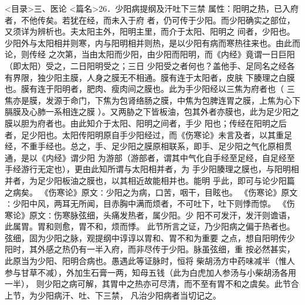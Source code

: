 \documentclass[a4paper,12pt,UTF8,twoside]{ctexbook}
\begin{document}
<目录>三、医论
<篇名>26．少阳病提纲及汗吐下三禁
属性：阳明之热，已入府者，不他传矣。若犹在经，而未入于府 
者，仍可传于少阳。而少阳确实之部位，又须详为辨析也。夫太阳主外，阳明主里，而介于太阳、阳明之 
间者，少阳也。少阳外与太阳相并则寒，内与阳明相并则热，是以少阳有病而寒热往来也。由此而论，则传经 
之次第，当由太阳而少阳，由少阳而阳明，而《内经》竟谓一日巨阳（即太阳）受之，二日阳明受之；三日 
少阳受之者何也？盖他手、足同名之经各有界限，独少阳主膜，人身之膜无不相通。膜有连于太阳者，皮肤 
下腠理之白膜也。膜有连于阳明者，肥肉、瘦肉间之膜也。此为手少阳经以三焦为府者也（ 
三焦亦是膜，发源于命门，下焦为包肾络肠之膜，中焦为包脾连胃之膜，上焦为心下膈膜及心肺一系相连之膜 
）。又两胁之下皆板油，包其外者亦膜也，此为足少阳之膜以胆为府者也。由此知介于太阳、阳明之间者，手少 
阳也；传经在阳明之后者，足少阳也。太阳传阳明原自手少阳经过，而《伤寒论》未言及者，以其重足 
经，不重手经也。总之，手、足少阳之膜原相联系，即手、足少阳之气化原相贯通，是以《内经》谓少阳 
为游部（游部者，谓其中气化自手经至足经，自足经至手经游行无定也），更由此知所谓与太阳相并者，为 
手少阳腠理之膜也，与阳明相并者，为足少阳板油之膜也，以其相近故能相并也。能明 
乎此，即可与论少阳篇之病矣。 
《伤寒论》原文∶少阳之为病，口苦，咽干，目眩也。 
《伤寒论》原文∶少阳中风，两耳无所闻，目赤胸中满而烦者，不可吐下，吐下则悸而惊。 
《伤寒论》原文∶伤寒脉弦细，头痛发热者，属少阳。少 
阳不可发汗，发汗则谵语，此属胃。胃和则愈，胃不和，烦而悸。 
此节所言之证，乃少阳病之偏于热者也。弦细，固为少阳之脉，观提纲中谆谆以胃和、胃不和为重要 
之点，想自阳明传少阳时，其外感之热仍有一半入府，而非尽传于少阳。脉虽弦细，重 
按必然甚实，此原当为少阳、阳明合病也。愚遇此等证脉时，恒将 
柴胡汤方中药味减半（惟人参与甘草不减），外加生石膏一两，知母五钱（此为白虎加人参汤与小柴胡汤各用一半）， 
则少阳之病可解，其胃中之热亦可尽清，而不至有胃不和之虞矣。此节合上节，为少阳病汗、吐、下三禁， 
凡治少阳病者当切记之。 
\end{document}
